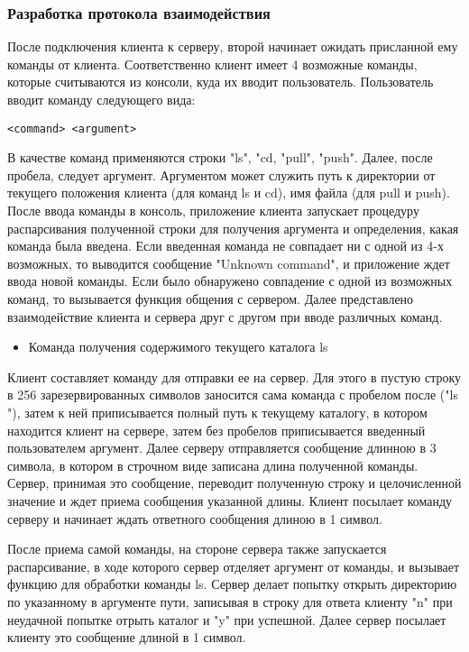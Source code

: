 \subsubsection{Разработка протокола взаимодействия}
После подключения клиента к серверу, второй начинает ожидать присланной ему команды от клиента. Соответственно клиент имеет 4 возможные команды, которые считываются из консоли, куда их вводит пользователь. Пользователь вводит команду следующего вида:
\begin{lstlisting}
<command> <argument>
\end{lstlisting}
В качестве команд применяются строки "ls", "cd, "pull", "push". Далее, после пробела, следует аргумент. Аргументом может служить путь к директории от текущего положения клиента (для команд ls и cd), имя файла (для pull и push). После ввода команды в консоль, приложение клиента запускает процедуру распарсивания полученной строки для получения аргумента и определения, какая команда была введена. Если введенная команда не совпадает ни с одной из 4-х возможных, то выводится сообщение "Unknown command", и приложение ждет ввода новой команды. Если было обнаружено совпадение с одной из возможных команд, то вызывается функция общения с сервером. Далее представлено взаимодействие клиента и сервера друг с другом при вводе различных команд.

\begin{itemize}
\item Команда получения содержимого текущего каталога ls
\end{itemize}

Клиент составляет команду для отправки ее на сервер. Для этого в пустую строку в 256 зарезервированных символов заносится сама команда с пробелом после ("ls "), затем к ней приписывается полный путь к текущему каталогу, в котором находится клиент на сервере, затем без пробелов приписывается введенный пользователем аргумент. Далее серверу отправляется сообщение длинною в 3 символа, в котором в строчном виде записана длина полученной команды. Сервер, принимая это сообщение, переводит полученную строку и целочисленной значение и ждет приема сообщения указанной длины. Клиент посылает команду серверу и начинает ждать ответного сообщения длиною в 1 символ. 

После приема самой команды, на стороне сервера также запускается распарсивание, в ходе которого сервер отделяет аргумент от команды, и вызывает функцию для обработки команды ls. Сервер делает попытку открыть директорию по указанному в аргументе пути, записывая в строку для ответа клиенту "n" при неудачной попытке отрыть каталог и "y" при успешной. Далее сервер посылает клиенту это сообщение длиной в 1 символ. 

